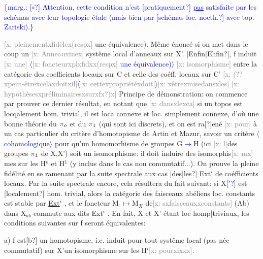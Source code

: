\documentclass[11pt]{article}
\newcommand{\scanpage}[1]{\par\bigskip\noindent{\small\sffamily[scan #1]}\par}
\newcommand{\mspage}[1]{{\small\sffamily[p.\,#1]}}
\newcommand{\hand}[1]{\textcolor{blue}{#1}}
\let\over\relax
\newcommand{\over}[2]{\textcolor{gray}{#1}\textcolor{blue}{\ensuremath{^{\!\nearrow}}#2}}
\newcommand{\inserted}[2][]{\textcolor{blue}{$\langle$#2$\rangle$}}
\newcommand{\margin}[1]{\textcolor{blue}{\{\textsf{marg.:} #1\}}}
\newcommand{\xout}[1]{\textcolor{gray}{[\textsf{x:} #1]}}
\newcommand{\uline}[1]{\underline{#1}}
\newcommand{\unsure}[1]{[#1?]}
\begin{document}
\margin{\unsure{$\circ$} Attention, cette condition n'est \unsure{pratiquement} \uline{pas} satisfaite par les schémas avec leur topologie étale (mais bien par \unsure{schémas loc. noeth.} avec top. Zariski).}

\mspage{34}

\clearpage
\scanpage{162-5/35}
\xout{pleinementxfidèlex(respx} une équivalence). Même énoncé si on met dans le
coup un \xout{Anneauxinex} systême local d'anneaux sur X'. \unsure{Enfin|Ehfin}, f induit \xout{une}
\inserted[typed]{\xout{foncteurxplxfidxx(respx} une équivalence)}
\xout{isomorphisme} entre la catégorie des coefficients locaux sur C et celle
des coéff. locaux sur C' \xout{(??xpeut-êtrexcelaxdoitxil}\inserted[typed]{\xout{cettexpropriétéxdoit}}\xout{xêtrexmisedansxles}
\xout{hypothèsesxpréliminairesxsurxfx?)x} Principe de démonstration: on commence
par prouver ce dernier résultat, en notant que \xout{dansxlexca} si un topos est
locqalement hom. trivial, il est loca connexe et loc. simplement connexe,
d'où une bonne théorie du $\hand{\pi}_o$ et du $\hand{\pi}_1$ (qui sont ici discrets), et on est
ra\unsure{\over{n}{m}}ené \xout{pour} à un cas particulier du critère d'homotopisme de Artin et
Mazur, savoir un critère \inserted[typed]{cohomologique} pour qu'un homomorhisme de groupes G\hand{$\longrightarrow$}H (ici \xout{l}des
groupes $\hand{\pi}_1$ de X,X') soit un isomorphisme: il doit induire des isomorphis\xout{mx}
mes sur les H$^o$ et H$^1$ (y inclus dans le cas non commutatif...). On prouve
la pleine fidélité en se ramenant par la suite spectrale aux cas \unsure{des|les} Ext$^i$
de coéfficients locaux. Par la suite spectrale encore, cela résultera du
fait suivant: si X\hand{\unsure{$'$}} est \unsure{localement} hom. trivial, alors la catégorie des
faisceaux abéliens loc. constants est stable par \uline{Ext}$^i$ , et le foncteur
M \hand{$\longmapsto$}M$_X$ de\xout{sxfaisceauxxconstants} (Ab) dans X$_{ab}$ commute aux dits Ext$^i$ .
En fait, X et X' étant loc homp\hand{|}triviaux, les conditions suivantes sur f
seront équivalentes:

a) f est\unsure{b} un homotopisme, i.e. induit pour tout systême local (pas
néc commutatif) sur X'un isomorphisme sur les H$^i$\xout{pourxixxx}.
\end{document}
